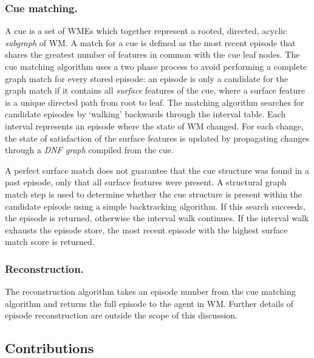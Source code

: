 \documentclass[envcountsame]{llncs}
\begin{document}
  \subsubsection{Cue matching.}
  \label{sec:soarcuematch}
  A cue is a set of WMEs which together represent a rooted, directed, acyclic \emph{subgraph} of WM.
  A match for a cue is defined as the most recent episode that shares the greatest number of features in common with the cue leaf nodes.
  The cue matching algorithm uses a two phase process to avoid performing a complete graph match for every stored episode:
  an episode is only a candidate for the graph match if it contains all \emph{surface} features of the cue, where a surface feature is a unique directed path from root to leaf.
  The matching algorithm searches for candidate episodes by `walking' backwards through the interval table.
  Each interval represents an episode where the state of WM changed.
  For each change, the state of satisfaction of the surface features is updated by propagating changes through a \emph{DNF graph} \cite{derbinsky2009efficiently} compiled from the cue.

  A perfect surface match does not guarantee that the cue structure was found in a past episode, only that all surface features were present.
  A structural graph match step is used to determine whether the cue structure is present within the candidate episode using a simple backtracking algorithm.
  If this search succeeds, the episode is returned, otherwise the interval walk continues.
  If the interval walk exhausts the episode store, the most recent episode with the highest surface match score is returned.

  \subsubsection{Reconstruction.}
  The reconstruction algorithm takes an episode number from the cue matching algorithm and returns the full episode to the agent in WM.
  Further details of episode reconstruction are outside the scope of this discussion.

  \subsection{Contributions}
  
\end{document}
